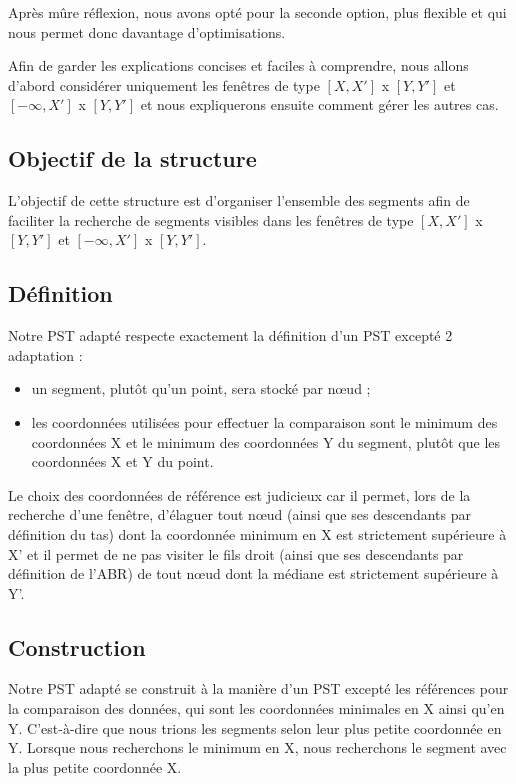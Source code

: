\documentclass[10pt,a4paper]{article}
\begin{document}
Après mûre réflexion, nous avons opté pour la seconde option, plus flexible et qui nous permet donc davantage d'optimisations.

Afin de garder les explications concises et faciles à comprendre, nous allons d'abord considérer uniquement les fenêtres de type $[X, X']$ x $[Y, Y']$ et $[-\infty, X']$ x $[Y, Y']$ et nous expliquerons ensuite comment gérer les autres cas.

\subsection{Objectif de la structure}
L'objectif de cette structure est d'organiser l'ensemble des segments afin de faciliter la recherche de segments visibles dans les fenêtres de type $[X, X']$ x $[Y, Y']$ et $[-\infty, X']$ x $[Y, Y']$.

\subsection{Définition}
Notre PST adapté respecte exactement la définition d'un PST excepté 2 adaptation :
\begin{itemize}
	\item un segment, plutôt qu'un point, sera stocké par nœud ;
	\item les coordonnées utilisées pour effectuer la comparaison sont le minimum des coordonnées X et le minimum des coordonnées Y du segment, plutôt que les coordonnées X et Y du point.
\end{itemize}

Le choix des coordonnées de référence est judicieux car il permet, lors de la recherche d'une fenêtre, d'élaguer tout nœud (ainsi que ses descendants par définition du tas) dont la coordonnée minimum en X est strictement supérieure à X' et il permet de ne pas visiter le fils droit (ainsi que ses descendants par définition de l'ABR) de tout nœud dont la médiane est strictement supérieure à Y'.

\subsection{Construction}
Notre PST adapté se construit à la manière d'un PST excepté les références pour la comparaison des données, qui sont les coordonnées minimales en X ainsi qu'en Y. C'est-à-dire que nous trions les segments selon leur plus petite coordonnée en Y. Lorsque nous recherchons le minimum en X, nous recherchons le segment avec la plus petite coordonnée X.
\end{document}
